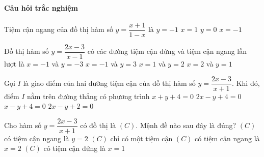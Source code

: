 \paragraph{Câu hỏi trắc nghiệm}
\begin{ex}%
	Tiệm cận ngang của đồ thị hàm số $y=\dfrac{x+1}{1-x}$ là
	\choice
	{\True $y=-1$}
	{$x=1$}
	{$y=0$}
	{$x=-1$}
\end{ex}

\begin{ex}%
	Đồ thị hàm số $y=\dfrac{2x-3}{x-1}$ có các đường tiệm cận đứng và tiệm cận ngang lần lượt là
	\choice
	{$x=-1$ và $y=-3$}
	{$x=-1$ và $y=3$}
	{\True $x=1$ và $y=2$}
	{$x=2$ và $y=1$}
\end{ex}

\begin{ex}%
	Gọi $I$ là giao điểm của hai đường tiệm cận của đồ thị hàm số $y=\dfrac{2x-3}{x+1}$. Khi đó, điểm $I$ nằm trên đường thẳng có phương trình 
	\choice
	{$x+y+4=0$}
	{\True $2x-y+4=0$}
	{$x-y+4=0$}
	{$2x-y+2=0$}
\end{ex}

\begin{ex}%
	Cho hàm số $y=\dfrac{2x-3}{x+1}$ có đồ thị là $(C)$. Mệnh đề nào sau đây là đúng?
	\choice
	{\True $(C)$ có tiệm cận ngang là $y=2$}
	{$(C)$ chỉ có một tiệm cận}
	{$(C)$ có tiệm cận ngang là $x=2$}
	{$(C)$ có tiệm cận đứng là $x=1$}
\end{ex}

